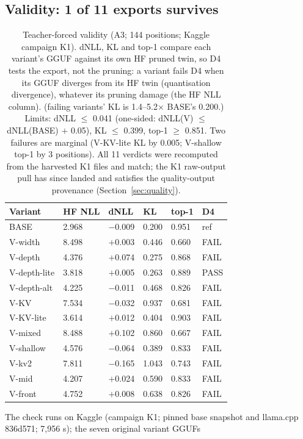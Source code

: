 \documentclass[10pt,letterpaper,twocolumn]{article}
\begin{document}
\subsection{Validity: 1 of 11 exports survives}
\label{sec:validity}
\begin{table}[ht]
\centering\scriptsize\setlength{\tabcolsep}{4pt}
\begin{tabular}{@{}llllll@{}}
\toprule
Variant & HF NLL & dNLL & KL & top-1 & D4 \\
\midrule
BASE & 2.968 & $-$0.009 & 0.200 & 0.951 & ref \\
V-width & 8.498 & $+$0.003 & 0.446 & 0.660 & FAIL \\
V-depth & 4.376 & $+$0.074 & 0.275 & 0.868 & FAIL \\
V-depth-lite & 3.818 & $+$0.005 & 0.263 & 0.889 & PASS \\
V-depth-alt & 4.225 & $-$0.011 & 0.468 & 0.826 & FAIL \\
V-KV & 7.534 & $-$0.032 & 0.937 & 0.681 & FAIL \\
V-KV-lite & 3.614 & $+$0.012 & 0.404 & 0.903 & FAIL \\
V-mixed & 8.488 & $+$0.102 & 0.860 & 0.667 & FAIL \\
V-shallow & 4.576 & $-$0.064 & 0.389 & 0.833 & FAIL \\
V-kv2 & 7.811 & $-$0.165 & 1.043 & 0.743 & FAIL \\
V-mid & 4.207 & $+$0.024 & 0.590 & 0.833 & FAIL \\
V-front & 4.752 & $+$0.008 & 0.638 & 0.826 & FAIL \\
\bottomrule
\end{tabular}
\caption{Teacher-forced validity (A3; 144 positions; Kaggle
campaign K1). dNLL, KL and top-1 compare each variant's GGUF
against its own HF pruned twin, so D4 tests the export, not the
pruning: a variant fails D4 when its GGUF diverges from its HF
twin (quantisation divergence), whatever its pruning damage (the
HF NLL column). (failing variants' KL is 1.4--5.2$\times$ BASE's 0.200.)
Limits: dNLL $\leq$ 0.041 (one-sided: dNLL(V) $\leq$
dNLL(BASE) $+$ 0.05), KL $\leq$ 0.399, top-1 $\geq$ 0.851.
Two failures are marginal (V-KV-lite KL by 0.005; V-shallow
top-1 by 3 positions). All 11 verdicts were recomputed
from the harvested K1 files and match; the K1 raw-output pull
has since landed and satisfies the quality-output provenance
(Section~\ref{sec:quality}).}
\end{table}
The check runs on Kaggle (campaign K1; pinned base snapshot and
llama.cpp 836d571; 7,956 s); the seven original variant GGUFs
\end{document}
